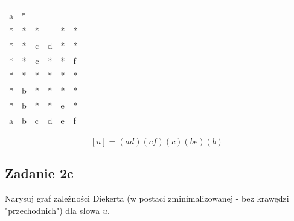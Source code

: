 \documentclass{article}
\begin{document}
\begin{table}[h]
\centering
\begin{tabular}{ccccll}
\multicolumn{1}{|l|}{}  & \multicolumn{1}{l|}{}  & \multicolumn{1}{l|}{}  & \multicolumn{1}{l|}{}  & \multicolumn{1}{l|}{}  & \multicolumn{1}{l|}{}  \\
\multicolumn{1}{|l|}{a} & \multicolumn{1}{l|}{*} & \multicolumn{1}{l|}{}  & \multicolumn{1}{l|}{}  & \multicolumn{1}{l|}{}  & \multicolumn{1}{l|}{}  \\
\multicolumn{1}{|c|}{*} & \multicolumn{1}{c|}{*} & \multicolumn{1}{c|}{*} & \multicolumn{1}{c|}{}  & \multicolumn{1}{l|}{*} & \multicolumn{1}{l|}{*} \\
\multicolumn{1}{|c|}{*} & \multicolumn{1}{c|}{*} & \multicolumn{1}{c|}{c} & \multicolumn{1}{c|}{d} & \multicolumn{1}{l|}{*} & \multicolumn{1}{l|}{*} \\
\multicolumn{1}{|c|}{*} & \multicolumn{1}{c|}{*} & \multicolumn{1}{c|}{c} & \multicolumn{1}{c|}{*} & \multicolumn{1}{l|}{*} & \multicolumn{1}{l|}{f} \\
\multicolumn{1}{|c|}{*} & \multicolumn{1}{c|}{*} & \multicolumn{1}{c|}{*} & \multicolumn{1}{c|}{*} & \multicolumn{1}{l|}{*} & \multicolumn{1}{l|}{*} \\
\multicolumn{1}{|c|}{*} & \multicolumn{1}{c|}{b} & \multicolumn{1}{c|}{*} & \multicolumn{1}{c|}{*} & \multicolumn{1}{l|}{*} & \multicolumn{1}{l|}{*} \\
\multicolumn{1}{|c|}{*} & \multicolumn{1}{c|}{b} & \multicolumn{1}{c|}{*} & \multicolumn{1}{c|}{*} & \multicolumn{1}{l|}{e} & \multicolumn{1}{l|}{*} \\ \hline
\multicolumn{1}{l}{a}   & \multicolumn{1}{l}{b}  & \multicolumn{1}{l}{c}  & \multicolumn{1}{l}{d}  & e                      & f                     
\end{tabular}
\end{table}

$$ [u] =  (ad)(cf)(c)(be)(b)$$

\subsection{Zadanie 2c}
Narysuj graf zależności Diekerta (w postaci zminimalizowanej - bez krawędzi "przechodnich") dla słowa $u$.
\end{document}
